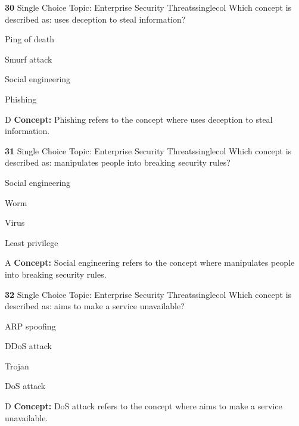 \documentclass[10pt,a4paper]{article}
\begin{document}
\begin{qcard}{\color{white}\textbf{30} \hfill \small Single Choice \textbar{} Topic: Enterprise Security Threats}{singlecol}
Which concept is described as: uses deception to steal information?

\begin{qoptions}
\item Ping of death
\item Smurf attack
\item Social engineering
\item Phishing
\end{qoptions}
\begin{explainbox}{D}
\textbf{Concept:} Phishing refers to the concept where uses deception to steal information.
\end{explainbox}
\end{qcard}

\begin{qcard}{\color{white}\textbf{31} \hfill \small Single Choice \textbar{} Topic: Enterprise Security Threats}{singlecol}
Which concept is described as: manipulates people into breaking security rules?

\begin{qoptions}
\item Social engineering
\item Worm
\item Virus
\item Least privilege
\end{qoptions}
\begin{explainbox}{A}
\textbf{Concept:} Social engineering refers to the concept where manipulates people into breaking security rules.
\end{explainbox}
\end{qcard}

\begin{qcard}{\color{white}\textbf{32} \hfill \small Single Choice \textbar{} Topic: Enterprise Security Threats}{singlecol}
Which concept is described as: aims to make a service unavailable?

\begin{qoptions}
\item ARP spoofing
\item DDoS attack
\item Trojan
\item DoS attack
\end{qoptions}
\begin{explainbox}{D}
\textbf{Concept:} DoS attack refers to the concept where aims to make a service unavailable.
\end{explainbox}
\end{qcard}
\end{document}
